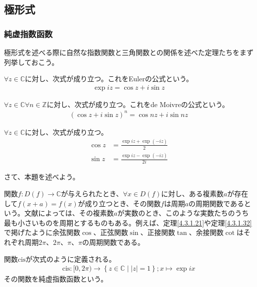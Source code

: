 \documentclass[dvipdfmx]{jsarticle}
\begin{document}
\subsection{極形式}%
\subsubsection{純虚指数函数}%
極形式を述べる際に自然な指数関数と三角関数との関係を述べた定理たちをまず列挙しておこう。
\begin{thm*}
$\forall z \in \mathbb{C}$に対し、次式が成り立つ。これをEulerの公式という。
\begin{align*}
\exp{iz} = \cos z + i\sin z
\end{align*}
\end{thm*}
\begin{thm*}
$\forall z \in \mathbb{C}\forall n \in \mathbb{Z}$に対し、次式が成り立つ。これをde Moivreの公式という。
\begin{align*}
\left( \cos z + i\sin z \right)^{n} = \cos{nz} + i\sin{nz}
\end{align*}
\end{thm*}
\begin{thm*} $\forall z \in \mathbb{C}$に対し、次式が成り立つ。
\begin{align*}
\cos z &= \frac{\exp{iz} + \exp( - iz)}{2}\\
\sin z &= \frac{\exp{iz} - \exp( - iz)}{2i}
\end{align*}
\end{thm*}\par
さて、本題を述べよう。
\begin{dfn}
関数$f:D(f) \rightarrow \mathbb{C}$が与えられたとき、$\forall x \in D(f)$に対し、ある複素数$a$が存在して$f(x + a) = f(x)$が成り立つとき、その関数$f$は周期$a$の周期関数であるという。文献によっては、その複素数$a$が実数のとき、このような実数たちのうち最も小さいものを周期とするものもある。例えば、定理\ref{4.3.1.21}や定理\ref{4.3.1.32}で掲げたように余弦関数$\cos$、正弦関数$\sin$、正接関数$\tan$、余接関数$\cot$はそれぞれ周期$2\pi$、$2\pi$、$\pi$、$\pi$の周期関数である。
\end{dfn}
\begin{dfn} 関数$\mathrm{cis}$が次式のように定義される。
\begin{align*}
\mathrm{cis}:[ 0,2\pi) \rightarrow \left\{ z \in \mathbb{C} \middle| |z| = 1 \right\};x \mapsto \exp{ix}
\end{align*}
その関数を純虚指数函数という。
\end{dfn}
\end{document}
